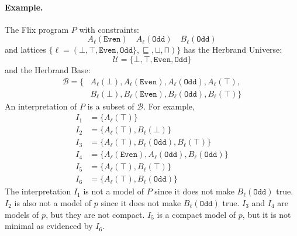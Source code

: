 \documentclass[10pt,twocolumn]{article}
\begin{document}
\paragraph{Example.}
The Flix program $P$ with constraints:
\[
    A_\ell(\texttt{Even}) \quad A_\ell(\texttt{Odd}) \quad B_\ell(\texttt{Odd})
\]
and lattices $\{ \ell = (\bot, \top, \texttt{Even}, \texttt{Odd}\}, \sqsubseteq, \sqcup, \sqcap) \}$ has
the Herbrand Universe:
%
\[
    \mathcal{U} = \{\bot, \top, \texttt{Even}, \texttt{Odd}\}
\]
%
and the Herbrand Base: 
%
\begin{align*}
    \mathcal{B} = \{ & A_\ell(\bot), A_\ell(\texttt{Even}), A_\ell(\texttt{Odd}), A_\ell(\top), \\
                     & B_\ell(\bot), B_\ell(\texttt{Even}), B_\ell(\texttt{Odd}), B_\ell(\top) \}
\end{align*}
%
An interpretation of $P$ is a subset of $\mathcal{B}$.
For example,
%
\begin{align*}
    I_1 & = \{ A_\ell(\top) \} \\
    I_2 & = \{ A_\ell(\top), B_\ell(\bot) \} \\
    I_3 & = \{ A_\ell(\top), B_\ell(\texttt{Odd}), B_\ell(\top) \} \\
    I_4 & = \{ A_\ell(\texttt{Even}), A_\ell(\texttt{Odd}), B_\ell(\texttt{Odd}) \} \\
    I_5 & = \{ A_\ell(\top), B_\ell(\top) \} \\
    I_6 & = \{ A_\ell(\top), B_\ell(\texttt{Odd}) \}
\end{align*}
%
The interpretation 
$I_1$ is not a model of $P$ since it does not make $B_\ell(\texttt{Odd})$ true.
$I_2$ is also not a model of $p$ since it does not make $B_\ell(\texttt{Odd})$ true.
$I_3$ and $I_4$ are models of $p$, but they are not compact.
$I_5$ is a compact model of $p$, but it is not minimal as evidenced by $I_6$.
\end{document}
